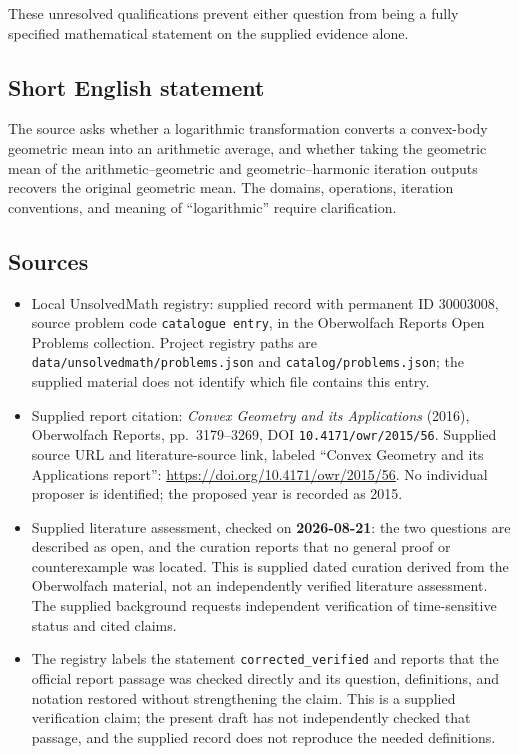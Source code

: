 \documentclass[11pt]{article}
\begin{document}
These unresolved qualifications prevent either question from being a fully specified mathematical statement on the supplied evidence alone.
\subsection{Short English statement}
The source asks whether a logarithmic transformation converts a convex-body geometric mean into an arithmetic average, and whether taking the geometric mean of the arithmetic--geometric and geometric--harmonic iteration outputs recovers the original geometric mean. The domains, operations, iteration conventions, and meaning of ``logarithmic'' require clarification.
\subsection{Sources}
\begin{itemize}
\item Local UnsolvedMath registry: supplied record with permanent ID \(30003008\), source problem code \texttt{catalogue entry}, in the Oberwolfach Reports Open Problems collection. Project registry paths are \texttt{data/unsolvedmath/problems.json} and \texttt{catalog/problems.json}; the supplied material does not identify which file contains this entry.
\item Supplied report citation: \emph{Convex Geometry and its Applications} (2016), Oberwolfach Reports, pp.~3179--3269, DOI \texttt{10.4171/owr/2015/56}. Supplied source URL and literature-source link, labeled ``Convex Geometry and its Applications report'': \url{https://doi.org/10.4171/owr/2015/56}. No individual proposer is identified; the proposed year is recorded as 2015.
\item Supplied literature assessment, checked on \textbf{2026-08-21}: the two questions are described as open, and the curation reports that no general proof or counterexample was located. This is supplied dated curation derived from the Oberwolfach material, not an independently verified literature assessment. The supplied background requests independent verification of time-sensitive status and cited claims.
\item The registry labels the statement \texttt{corrected\_verified} and reports that the official report passage was checked directly and its question, definitions, and notation restored without strengthening the claim. This is a supplied verification claim; the present draft has not independently checked that passage, and the supplied record does not reproduce the needed definitions.
\end{itemize}
\end{document}
